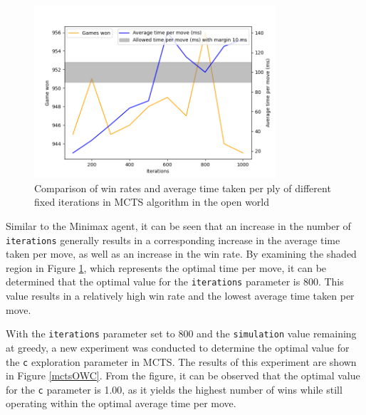 \begin{figure}[h!]
  \centering
  \captionsetup{justification=centering}
  \includegraphics[width=0.8\textwidth]{../img/mcts_iterations_openworld.png}
  \caption{Comparison of win rates and average time taken per ply of different fixed iterations in MCTS algorithm in the open world}
  \label{mctsOWIterations}
\end{figure}

Similar to the Minimax agent, it can be seen that an increase in the number of \texttt{iterations} generally results in a corresponding increase in the average time taken per move, as well as an increase in the win rate. By examining the shaded region in Figure \ref{mctsOWIterations}, which represents the optimal time per move, it can be determined that the optimal value for the \texttt{iterations} parameter is 800. This value results in a relatively high win rate and the lowest average time taken per move.

With the \texttt{iterations} parameter set to 800 and the \texttt{simulation} value remaining at greedy, a new experiment was conducted to determine the optimal value for the \texttt{c} exploration parameter in MCTS. The results of this experiment are shown in Figure \ref{mctsOWC}. From the figure, it can be observed that the optimal value for the \texttt{c} parameter is 1.00, as it yields the highest number of wins while still operating within the optimal average time per move.

